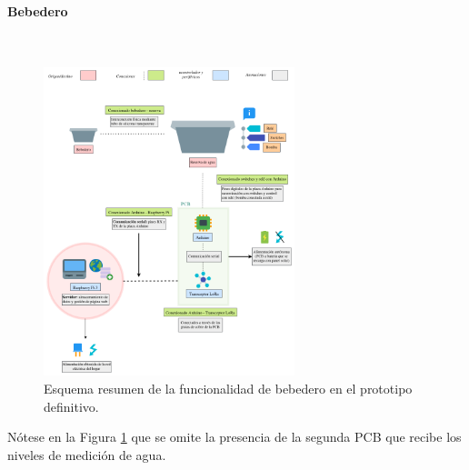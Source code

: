 \documentclass[12pt]{article}
\newcommand{\subsubsubsection}[1]{\paragraph{#1}\mbox{}\\}
\begin{document}
	\pagebreak
	
	\subsubsubsection{Bebedero}
	\begin{figure}[h!]
		\begin{center}
			\includegraphics[width=0.65\textwidth]{img/conexiones tfg-bebedero.png}
			\caption{Esquema resumen de la funcionalidad de bebedero en el prototipo definitivo.}
			\label{Conexiones TFG bebedero.}
		\end{center}
	\end{figure}
	
	\noindent Nótese en la Figura \ref{Conexiones TFG bebedero.} que se omite la presencia de la segunda PCB que recibe los niveles de medición de agua.
	
	\pagebreak
	
\end{document}
